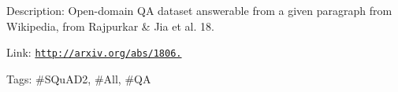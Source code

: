 Description\+: Open-\/domain QA dataset answerable from a given paragraph from Wikipedia, from Rajpurkar \& Jia et al. \textquotesingle{}18.

Link\+: \href{http://arxiv.org/abs/1806.03822}{\tt http\+://arxiv.\+org/abs/1806.}

Tags\+: \#\+S\+Qu\+A\+D2, \#\+All, \#\+QA 